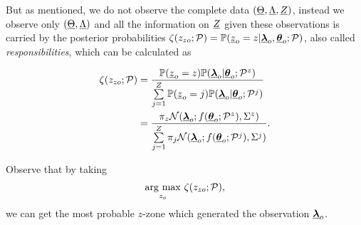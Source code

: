 \documentclass{ifacconf}  %
\begin{document}
But as mentioned, we do not observe the complete data $(\underline{\Theta},\underline{\Lambda},\underline{Z})$, instead we observe only $(\underline{\Theta},\underline{\Lambda})$ and all the information on $\underline{Z}$ given these observations is carried by the posterior probabilities  ${\zeta(z_{zo};\mathcal{P})=\mathbb{P}(\underline{z}_{o}=z|{\underline{\boldsymbol{\lambda}}}_{o},{\underline{\boldsymbol{\theta}}}_{o};\mathcal{P})}$, also called \emph{responsibilities}, which can be calculated as

\begin{align}
  \label{eq:responsibilities}
\zeta(z_{zo};\mathcal{P})&=\frac{\mathbb{P}(\underline{z}_{o}=z)\mathbb{P}({\underline{\boldsymbol{\lambda}}}_{o}|{\underline{\boldsymbol{\theta}}}_{o};\mathcal{P}^{z})}{\sum\limits_{j=1}^{Z}\mathbb{P}(\underline{z}_{o}=j)\mathbb{P}({\underline{\boldsymbol{\lambda}}}_{o}|{\underline{\boldsymbol{\theta}}}_{o};\mathcal{P}^{j})}\nonumber\\
  &=\frac{\pi_{z}{\mathcal{N}({\underline{\boldsymbol{\lambda}}}_{o};f({\underline{\boldsymbol{\theta}}}_{o};\mathcal{P}^{z}),{\Sigma^{z}})}}{\sum\limits_{j=1}^{Z}\pi_{j}\mathcal{N}({\underline{\boldsymbol{\lambda}}}_{o};f({\underline{\boldsymbol{\theta}}}_{o};\mathcal{P}^{j}),{\Sigma^{j}})}.
\end{align}

Observe that by taking
\begin{equation}\label{eq:argmaxz}
\underset{z_{o}}{\operatorname{arg\ max}}\ {\zeta(z_{zo};\mathcal{P})},
\end{equation}
we can get the most probable $z$-zone which generated the observation ${\underline{\boldsymbol{\lambda}}}_{o}$.
\end{document}
